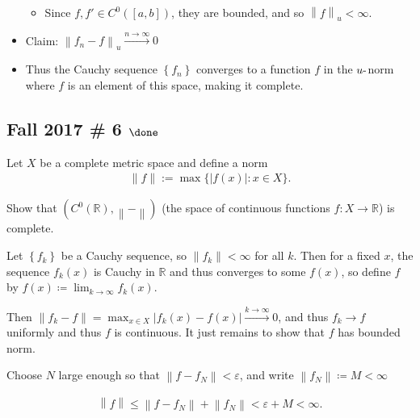\begin{solution}
\begin{itemize}
  \begin{itemize}
  \tightlist
  \item
    Since \(f, f'\in C^0([a, b])\), they are bounded, and so
    \({\left\lVert {f} \right\rVert}_u < \infty\).
  \end{itemize}
\item
  Claim:
  \({\left\lVert {f_n - f} \right\rVert}_u \overset{n\to\infty}\to 0\)
\item
  Thus the Cauchy sequence \(\left\{{f_n}\right\}\) converges to a
  function \(f\) in the \(u{\hbox{-}}\)norm where \(f\) is an element of
  this space, making it complete.
\end{itemize}

\end{solution}

\hypertarget{fall-2017-6-done}{%
\subsection{\texorpdfstring{Fall 2017 \# 6
\(\done\)}{Fall 2017 \# 6 \textbackslash done}}\label{fall-2017-6-done}}

Let \(X\) be a complete metric space and define a norm
\begin{align*}
\|f\|:=\max \{|f(x)|: x \in X\}.
\end{align*}

Show that \((C^0({\mathbb{R}}), {\left\lVert {{-}} \right\rVert} )\)
(the space of continuous functions \(f: X\to {\mathbb{R}}\)) is
complete.


\begin{solution}

\hfill

Let \(\left\{{f_k}\right\}\) be a Cauchy sequence, so
\({\left\lVert {f_k} \right\rVert} < \infty\) for all \(k\). Then for a
fixed \(x\), the sequence \(f_k(x)\) is Cauchy in \({\mathbb{R}}\) and
thus converges to some \(f(x)\), so define \(f\) by
\(f(x) \coloneqq\lim_{k\to\infty} f_k(x)\).

Then
\({\left\lVert {f_k - f} \right\rVert} = \max_{x\in X}{\left\lvert {f_k(x) - f(x)} \right\rvert} \overset{k\to\infty}\to 0\),
and thus \(f_k \to f\) uniformly and thus \(f\) is continuous. It just
remains to show that \(f\) has bounded norm.

Choose \(N\) large enough so that
\({\left\lVert {f - f_N} \right\rVert} < \varepsilon\), and write
\({\left\lVert {f_N} \right\rVert} \coloneqq M < \infty\)

\begin{align*}
{\left\lVert {f} \right\rVert} \leq {\left\lVert {f - f_N} \right\rVert} + {\left\lVert {f_N} \right\rVert} < \varepsilon + M < \infty
.\end{align*}

\end{solution}

